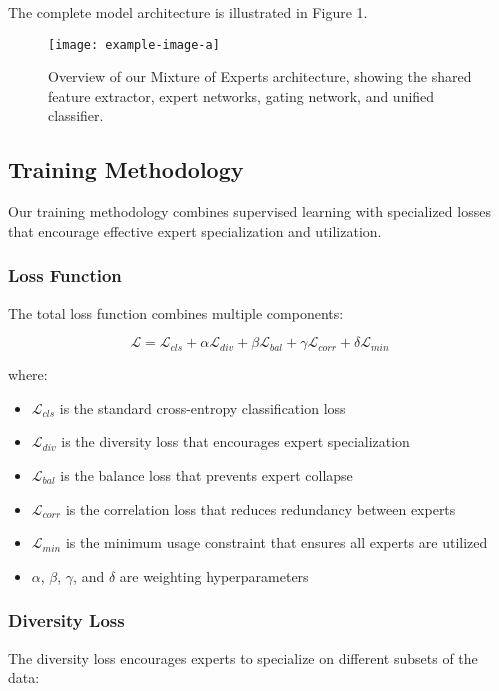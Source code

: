 \documentclass[conference]{IEEEtran}
\begin{document}
The complete model architecture is illustrated in Figure 1.

\begin{figure}[!t]
\centering
\texttt{[image: example-image-a]}
\caption{Overview of our Mixture of Experts architecture, showing the shared feature extractor, expert networks, gating network, and unified classifier.}
\label{fig_architecture}
\end{figure}

\subsection{Training Methodology}
Our training methodology combines supervised learning with specialized losses that encourage effective expert specialization and utilization.

\subsubsection{Loss Function}
The total loss function combines multiple components:

\begin{equation}
\mathcal{L} = \mathcal{L}_{cls} + \alpha \mathcal{L}_{div} + \beta \mathcal{L}_{bal} + \gamma \mathcal{L}_{corr} + \delta \mathcal{L}_{min}
\end{equation}

where:
\begin{itemize}
    \item $\mathcal{L}_{cls}$ is the standard cross-entropy classification loss
    \item $\mathcal{L}_{div}$ is the diversity loss that encourages expert specialization
    \item $\mathcal{L}_{bal}$ is the balance loss that prevents expert collapse
    \item $\mathcal{L}_{corr}$ is the correlation loss that reduces redundancy between experts
    \item $\mathcal{L}_{min}$ is the minimum usage constraint that ensures all experts are utilized
    \item $\alpha$, $\beta$, $\gamma$, and $\delta$ are weighting hyperparameters
\end{itemize}

\subsubsection{Diversity Loss}
The diversity loss encourages experts to specialize on different subsets of the data:
\end{document}
